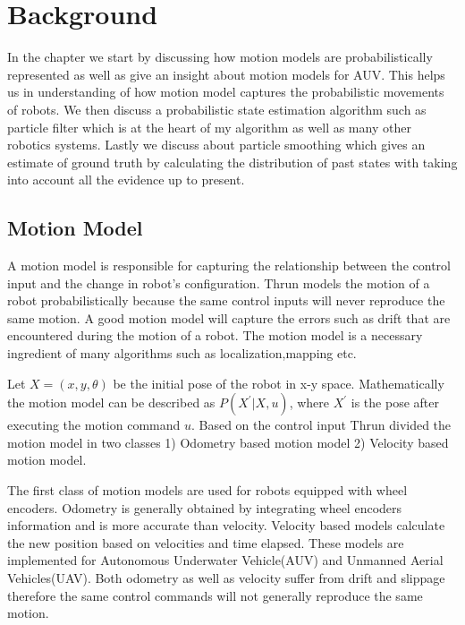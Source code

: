 \documentclass[12pt,draft]{dalcsthesis}
\begin{document}
\chapter{Background}
In the chapter we start by discussing how motion models are probabilistically represented as well as give an insight about motion models for AUV. This helps us in understanding of how motion model captures the probabilistic movements of robots. We then discuss a probabilistic state estimation algorithm such as particle filter \cite{ristic2004beyond} \cite{chen2003bayesian} which is at the heart of my algorithm as well as many other robotics systems. Lastly we discuss about particle smoothing \cite{doucet2000monte} \cite{doucet2009tutorial} which gives an estimate of ground truth by calculating the distribution of past states with taking into account all the evidence up to present. 

\section{Motion Model}
\label{chap-:Motion Model}
A motion model is responsible for capturing the relationship between the control input and the change in robot's configuration. Thrun \cite{thrun2005probabilistic} models the motion of a robot probabilistically because the same
control inputs will never reproduce the same motion. A good motion model will capture the errors such as drift that are encountered during the motion of a robot. The motion model is a necessary ingredient of many algorithms such as localization,mapping etc. 

Let $X=(x,y,\theta)$ be the initial pose of the robot in x-y space. Mathematically the motion model can be described as $P(X^{'}|X,u)$, where $X^{'}$ is the pose after executing the motion command $u$. Based on the control input Thrun \cite{thrun2005probabilistic} divided the motion model in two classes 1) Odometry based motion model 2) Velocity based motion model.

The first class of motion models are used for robots equipped with wheel encoders. Odometry is generally obtained by integrating wheel encoders information and is more accurate than velocity.  
Velocity based models calculate the new position based on velocities and time elapsed. These models are implemented for Autonomous Underwater Vehicle(AUV) and Unmanned Aerial Vehicles(UAV). Both odometry as well as velocity suffer from drift and slippage therefore the same control commands will not generally reproduce the same motion.
\end{document}
